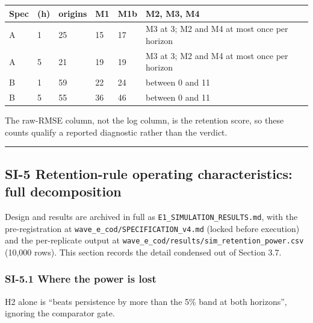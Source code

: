 \documentclass[11pt]{article}
\begin{document}
{\def\LTcaptype{none} %
\begin{longtable}[]{@{}llllll@{}}
\toprule\noalign{}
Spec & (h) & origins & M1 & M1b & M2, M3, M4 \\
\midrule\noalign{}
\endhead
\bottomrule\noalign{}
\endlastfoot
A & 1 & 25 & 15 & 17 & M3 at 3; M2 and M4 at most once per horizon \\
A & 5 & 21 & 19 & 19 & M3 at 3; M2 and M4 at most once per horizon \\
B & 1 & 59 & 22 & 24 & between 0 and 11 \\
B & 5 & 55 & 36 & 46 & between 0 and 11 \\
\end{longtable}
}

The raw-RMSE column, not the log column, is the retention score, so
these counts qualify a reported diagnostic rather than the verdict.

\begin{center}\rule{0.5\linewidth}{0.5pt}\end{center}

\subsection{SI-5 Retention-rule operating characteristics: full
decomposition}\label{si-5-retention-rule-operating-characteristics-full-decomposition}

Design and results are archived in full as
\texttt{E1\_SIMULATION\_RESULTS.md}, with the pre-registration at
\texttt{wave\_e\_cod/SPECIFICATION\_v4.md} (locked before execution) and
the per-replicate output at
\texttt{wave\_e\_cod/results/sim\_retention\_power.csv} (10,000 rows).
This section records the detail condensed out of Section 3.7.

\subsubsection{SI-5.1 Where the power is
lost}\label{si-5.1-where-the-power-is-lost}

H2 alone is ``beats persistence by more than the 5\% band at both
horizons'', ignoring the comparator gate.
\end{document}
